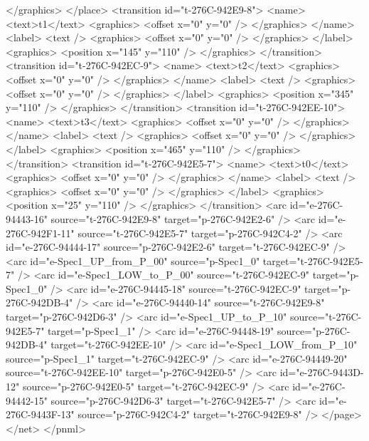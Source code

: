     </graphics>
   </place>
   <transition id="t-276C-942E9-8">
    <name>
     <text>t1</text>
     <graphics>
      <offset x="0" y="0" />
     </graphics>
    </name>
    <label>
     <text />
     <graphics>
      <offset x="0" y="0" />
     </graphics>
    </label>
    <graphics>
     <position x="145" y="110" />
    </graphics>
   </transition>
   <transition id="t-276C-942EC-9">
    <name>
     <text>t2</text>
     <graphics>
      <offset x="0" y="0" />
     </graphics>
    </name>
    <label>
     <text />
     <graphics>
      <offset x="0" y="0" />
     </graphics>
    </label>
    <graphics>
     <position x="345" y="110" />
    </graphics>
   </transition>
   <transition id="t-276C-942EE-10">
    <name>
     <text>t3</text>
     <graphics>
      <offset x="0" y="0" />
     </graphics>
    </name>
    <label>
     <text />
     <graphics>
      <offset x="0" y="0" />
     </graphics>
    </label>
    <graphics>
     <position x="465" y="110" />
    </graphics>
   </transition>
   <transition id="t-276C-942E5-7">
    <name>
     <text>t0</text>
     <graphics>
      <offset x="0" y="0" />
     </graphics>
    </name>
    <label>
     <text />
     <graphics>
      <offset x="0" y="0" />
     </graphics>
    </label>
    <graphics>
     <position x="25" y="110" />
    </graphics>
   </transition>
   <arc id="e-276C-94443-16" source="t-276C-942E9-8" target="p-276C-942E2-6" />
   <arc id="e-276C-942F1-11" source="t-276C-942E5-7" target="p-276C-942C4-2" />
   <arc id="e-276C-94444-17" source="p-276C-942E2-6" target="t-276C-942EC-9" />
   <arc id="e-Spec1_UP_from_P_00" source="p-Spec1_0" target="t-276C-942E5-7" />
   <arc id="e-Spec1_LOW_to_P_00" source="t-276C-942EC-9" target="p-Spec1_0" />
   <arc id="e-276C-94445-18" source="t-276C-942EC-9" target="p-276C-942DB-4" />
   <arc id="e-276C-94440-14" source="t-276C-942E9-8" target="p-276C-942D6-3" />
   <arc id="e-Spec1_UP_to_P_10" source="t-276C-942E5-7" target="p-Spec1_1" />
   <arc id="e-276C-94448-19" source="p-276C-942DB-4" target="t-276C-942EE-10" />
   <arc id="e-Spec1_LOW_from_P_10" source="p-Spec1_1" target="t-276C-942EC-9" />
   <arc id="e-276C-94449-20" source="t-276C-942EE-10" target="p-276C-942E0-5" />
   <arc id="e-276C-9443D-12" source="p-276C-942E0-5" target="t-276C-942EC-9" />
   <arc id="e-276C-94442-15" source="p-276C-942D6-3" target="t-276C-942E5-7" />
   <arc id="e-276C-9443F-13" source="p-276C-942C4-2" target="t-276C-942E9-8" />
  </page>
 </net>
</pnml>
